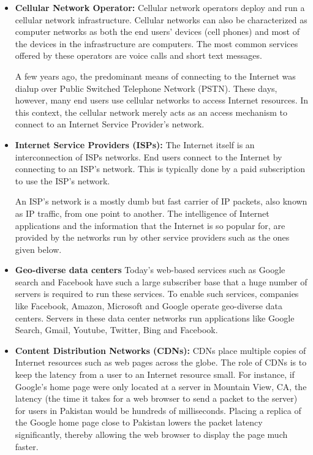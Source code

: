 \begin{itemize}
\item \textbf{Cellular Network Operator:} Cellular network operators deploy and run a cellular network infrastructure. Cellular networks can also be characterized as computer networks as both the end users' devices (cell phones) and most of the devices in the infrastructure are computers. The most common services offered by these operators are voice calls and short text messages. 

A few years ago, the predominant means of connecting to the Internet was dialup over Public Switched Telephone Network (PSTN). These days, however, many end users use cellular networks to access Internet resources. In this context, the cellular network merely acts as an access mechanism to connect to an Internet Service Provider's network.


\item \textbf{Internet Service Providers (ISPs):} The Internet itself is an interconnection of ISPs networks. End users connect to the Internet by connecting to an ISP's network. This is typically done by a paid subscription to use the ISP's network. 

An ISP's network is a mostly dumb but fast carrier of IP packets, also known as IP traffic, from one point to another. The intelligence of Internet applications and the information that the Internet is so popular for, are provided by the networks run by other service providers such as the ones given below.
\item \textbf{Geo-diverse data centers} Today's web-based services such as Google search and Facebook have such a large subscriber base that a huge number of servers is required to run these services. To enable such services, companies like Facebook, Amazon, Microsoft and Google operate geo-diverse data centers. Servers in these data center networks run applications like Google Search, Gmail, Youtube, Twitter, Bing and Facebook.
\item \textbf{Content Distribution Networks (CDNs):} CDNs place multiple copies of Internet resources such as web pages across the globe. The role of CDNs is to keep the latency from a user to an Internet resource small. For instance, if Google's home page were only located at a server in Mountain View, CA, the latency (the time it takes for a web browser to send a packet to the server) for users in Pakistan would be hundreds of milliseconds. Placing a replica of the Google home page close to Pakistan lowers the packet latency significantly, thereby allowing the web browser to display the page much faster.
\end{itemize}


